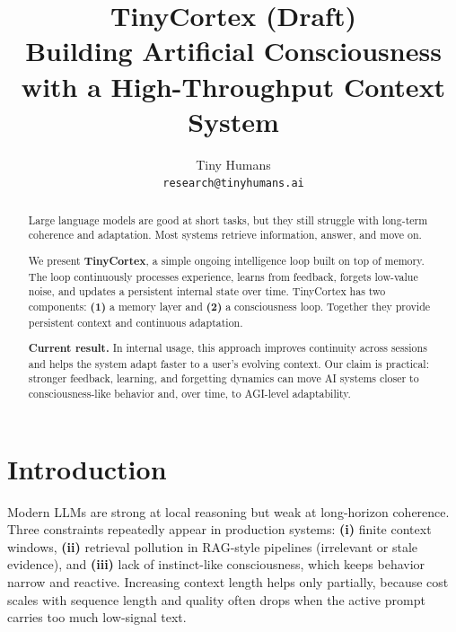 \documentclass{article}
\title{TinyCortex (Draft)\\\large Building Artificial Consciousness with a High-Throughput Context System}
\author{
  Tiny Humans \\
  \texttt{research@tinyhumans.ai} \\
}
\begin{document}
\maketitle
\begin{abstract}
\vspace{-0.2em}
{\small
\begin{minipage}{\linewidth}
\setlength{\parskip}{0.35em}
\noindent
Large language models are good at short tasks, but they still struggle with
long-term coherence and adaptation. Most systems retrieve information, answer,
and move on.

\smallskip\noindent
We present \textbf{TinyCortex}, a simple ongoing intelligence loop built on top
of memory. The loop continuously processes experience, learns from feedback,
forgets low-value noise, and updates a persistent internal state over time.
\smallskip\noindent
TinyCortex has two components: \textbf{(1)} a memory layer and
\textbf{(2)} a consciousness loop. Together they provide persistent context
and continuous adaptation.

\smallskip\noindent
\textbf{Current result.} In internal usage, this approach improves continuity
across sessions and helps the system adapt faster to a user's evolving context.
Our claim is practical: stronger feedback, learning, and forgetting dynamics
can move AI systems closer to consciousness-like behavior and, over time, to
AGI-level adaptability.
\end{minipage}
}

\end{abstract}


\section{Introduction}

Modern LLMs are strong at local reasoning but weak at long-horizon
coherence. Three constraints repeatedly appear in production systems:
\textbf{(i)} finite context windows, \textbf{(ii)} retrieval pollution in
RAG-style pipelines (irrelevant or stale evidence), and
\textbf{(iii)} lack of instinct-like consciousness, which keeps behavior
narrow and reactive. Increasing context length helps only partially, because
cost scales with sequence length and quality often drops when the active prompt
carries too much low-signal text.
\end{document}
